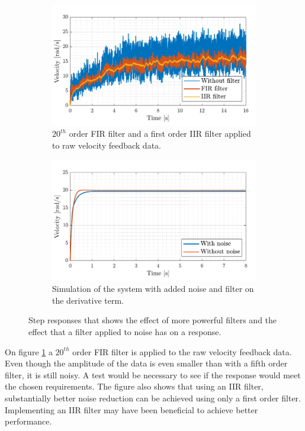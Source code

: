 \documentclass[../../main.tex]{subfiles}
\begin{document}
\begin{figure}[H]
     \centering
     \begin{subfigure}[b]{0.49\textwidth}
         \centering
    \includegraphics[width=\textwidth]{Sections/Miscellaneous/Images/FilteredStepRespons20Order.pdf}
    \caption{$20^{th}$ order FIR filter and a first order IIR filter applied to raw velocity feedback data.}
    \label{fig:FilteredStepRespons20Order}
     \end{subfigure}
     \hfill
     \begin{subfigure}[b]{0.49\textwidth}
         \centering
         \includegraphics[width=\textwidth]{Sections/Miscellaneous/Images/StepResponsAddedNoiseAndFilter.pdf}
         \caption{Simulation of the system with added noise and filter on the derivative term.}
         \label{fig:StepResponsAddedNoiseAndFilter}
     \end{subfigure}
        \caption{Step responses that shows the effect of more powerful filters and the effect that a filter applied to noise has on a response.}
        \label{fig:FilterDiskussionImplementedFilter20}
\end{figure}
On figure \ref{fig:FilteredStepRespons20Order} a $20^{th}$ order FIR filter is applied to the raw velocity feedback data. Even though the amplitude of the data is even smaller than with a fifth order filter, it is still noisy. A test would be necessary to see if the response would meet the chosen requirements. The figure also shows that using an IIR filter, substantially better noise reduction can be achieved using only a first order filter. Implementing an IIR filter may have been beneficial to achieve better performance.
\end{document}
